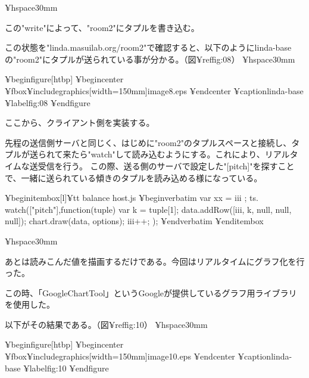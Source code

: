 ¥hspace{30mm}

この"write"によって、"room2"にタプルを書き込む。

この状態を"linda.masuilab.org/room2"で確認すると、以下のようにlinda-baseの"room2"にタプルが送られている事が分かる。（図¥ref{fig:08}）
¥hspace{30mm}

¥begin{figure}[htbp]
    ¥begin{center}
       ¥fbox{¥includegraphics[width=150mm]{image8.eps}}
    ¥end{center}
    ¥caption{linda-base}
    ¥label{fig:08}
¥end{figure}




ここから、クライアント側を実装する。

先程の送信側サーバと同じく、はじめに"room2"のタプルスペースと接続し、タプルが送られて来たら"watch"して読み込むようにする。これにより、リアルタイムな送受信を行う。
この際、送る側のサーバで設定した"[pitch]"を探すことで、一緒に送られている傾きのタプルを読み込める様になっている。


¥begin{itembox}[l]{{¥tt balance host.js}}
¥begin{verbatim}
var xx = iii ;
     ts. watch(["pitch"],function(tuple){
            var k = tuple[1];
            data.addRow([iii, k, null, null, null]);
            chart.draw(data, options);
            iii++;
    });
¥end{verbatim}
¥end{itembox}


¥hspace{30mm} 

あとは読みこんだ値を描画するだけである。今回はリアルタイムにグラフ化を行った。

この時、「GoogleChartTool」というGoogleが提供しているグラフ用ライブラリを使用した。

以下がその結果である。（図¥ref{fig:10}）
¥hspace{30mm}

¥begin{figure}[htbp]
    ¥begin{center}
       ¥fbox{¥includegraphics[width=150mm]{image10.eps}}
    ¥end{center}
    ¥caption{linda-base}
    ¥label{fig:10}
¥end{figure}







